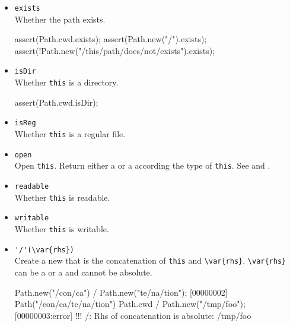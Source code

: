 \begin{itemize}
\item \lstinline|exists|\\
  Whether the path exists.
\begin{urbiscript}[firstnumber=last]
assert(Path.cwd.exists);
assert(Path.new("/").exists);
assert(!Path.new("/this/path/does/not/exists").exists);
\end{urbiscript}

\item \lstinline|isDir|\\
  Whether \lstinline|this| is a directory.
\begin{urbiscript}[firstnumber=last]
assert(Path.cwd.isDir);
\end{urbiscript}

\item \lstinline|isReg|\\
  Whether \lstinline|this| is a regular file.

\item \lstinline|open|\\
  Open \lstinline|this|. Return either a  or a
   according the type of \lstinline|this|. See
   and .

\item \lstinline|readable|\\
  Whether \lstinline|this| is readable.

\item \lstinline|writable|\\
  Whether \lstinline|this| is writable.

\item \lstinline|'/'(\var{rhs})|\\
  Create a new  that is the concatenation of
  \lstinline|this| and \lstinline|\var{rhs}|. \lstinline|\var{rhs}|
  can be a  or a  and cannot be absolute.
\begin{urbiscript}[firstnumber=last]
Path.new("/con/ca") / Path.new("te/na/tion");
[00000002] Path("/con/ca/te/na/tion")
Path.cwd / Path.new("/tmp/foo");
[00000003:error] !!! /: Rhs of concatenation is absolute: /tmp/foo
\end{urbiscript}

\end{itemize}



